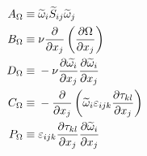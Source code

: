 \begin{subequations}
    \begin{align}
        A_{\Omega} \equiv \; &
            \widetilde{\omega}_{i} \widetilde{S}_{ij} \widetilde{\omega}_{j}\\
        B_{\Omega} \equiv \; &
            \nu \pdv{}{x_{j}} \left( \pdv{\Omega}{x_{j}} \right)\\
        D_{\Omega} \equiv \; &
            -\nu \pdv{\widetilde{\omega_{i}}}{x_{j}}\pdv{\widetilde{\omega}_{i}}{x_{j}}\\
        C_{\Omega} \equiv \; &
            -\pdv{}{x_{j}} \left(\widetilde{\omega}_{i} \varepsilon_{ijk} \pdv{\tau_{kl}}{x_{j}} \right)\\
        P_{\Omega} \equiv \; &
            \varepsilon_{ijk} \pdv{\tau_{kl}}{x_{j}} \pdv{\widetilde{\omega}_{i}}{x_{j}}
    \end{align}
\end{subequations}


